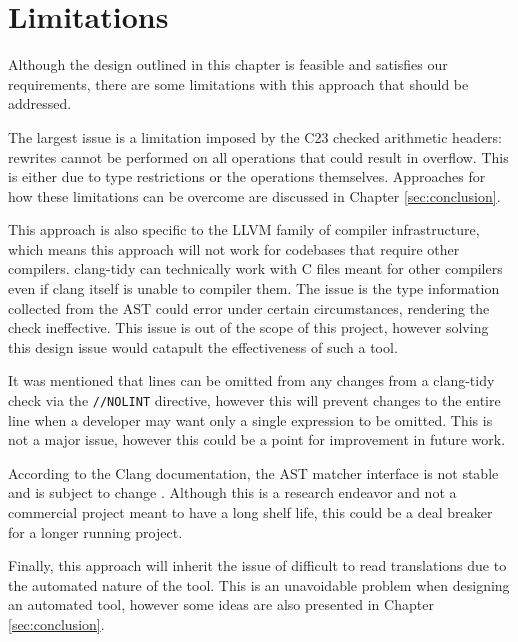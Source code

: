 \section{Limitations}

Although the design outlined in this chapter is feasible and satisfies our requirements, there are some limitations with this approach that should be addressed.

The largest issue is a limitation imposed by the C23 checked arithmetic headers: rewrites cannot be performed on all operations that could result in overflow. This is either due to type restrictions or the operations themselves. Approaches for how these limitations can be overcome are discussed in Chapter \ref{sec:conclusion}.

This approach is also specific to the LLVM family of compiler infrastructure, which means this approach will not work for codebases that require other compilers. clang-tidy can technically work with C files meant for other compilers even if clang itself is unable to compiler them. The issue is the type information collected from the AST could error under certain circumstances, rendering the check ineffective. This issue is out of the scope of this project, however solving this design issue would catapult the effectiveness of such a tool.

It was mentioned that lines can be omitted from any changes from a clang-tidy check via the \texttt{//NOLINT} directive, however this will prevent changes to the entire line when a developer may want only a single expression to be omitted. This is not a major issue, however this could be a point for improvement in future work.

According to the Clang documentation, the AST matcher interface is not stable and is subject to change \cite{clang-interfaces}. Although this is a research endeavor and not a commercial project meant to have a long shelf life, this could be a deal breaker for a longer running project.

Finally, this approach will inherit the issue of difficult to read translations due to the automated nature of the tool. This is an unavoidable problem when designing an automated tool, however some ideas are also presented in Chapter \ref{sec:conclusion}.